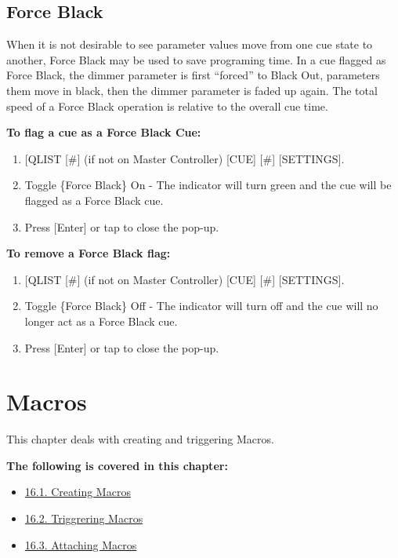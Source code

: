 \documentclass[
]{article}
\providecommand{\tightlist}{%
  \setlength{\itemsep}{0pt}\setlength{\parskip}{0pt}}
\begin{document}
\hypertarget{force-black}{%
\subsection{Force Black}\label{force-black}}

When it is not desirable to see parameter values move from one cue state to another, Force Black may be used to save programing time. In a cue flagged as Force Black, the dimmer parameter is first ``forced'' to Black Out, parameters them move in black, then the dimmer parameter is faded up again. The total speed of a Force Black operation is relative to the overall cue time.

\textbf{To flag a cue as a Force Black Cue:}

\begin{enumerate}
\def\labelenumi{\arabic{enumi}.}
\item
  {[}QLIST {[}\#{]} (if not on Master Controller) {[}CUE{]} {[}\#{]} {[}SETTINGS{]}.
\item
  Toggle \{Force Black\} On - The indicator will turn green and the cue will be flagged as a Force Black cue.
\item
  Press {[}Enter{]} or tap \href{image.png}{} to close the pop-up.
\end{enumerate}

\textbf{To remove a Force Black flag:}

\begin{enumerate}
\def\labelenumi{\arabic{enumi}.}
\item
  {[}QLIST {[}\#{]} (if not on Master Controller) {[}CUE{]} {[}\#{]} {[}SETTINGS{]}.
\item
  Toggle \{Force Black\} Off - The indicator will turn off and the cue will no longer act as a Force Black cue.
\item
  Press {[}Enter{]} or tap \href{image.png}{} to close the pop-up.
\end{enumerate}

\hypertarget{macros}{%
\section{Macros}\label{macros}}

This chapter deals with creating and triggering Macros.

\textbf{The following is covered in this chapter:}

\begin{itemize}
\tightlist
\item
  \href{https://vibemanual.compulite.com/macros.html\#creating-macros}{16.1. Creating Macros}
\item
  \href{https://vibemanual.compulite.com/macros.html\#triggrering-macros}{16.2. Triggrering Macros}
\item
  \href{https://vibemanual.compulite.com/macros.html\#attaching-macros}{16.3. Attaching Macros}
\end{itemize}
\end{document}
